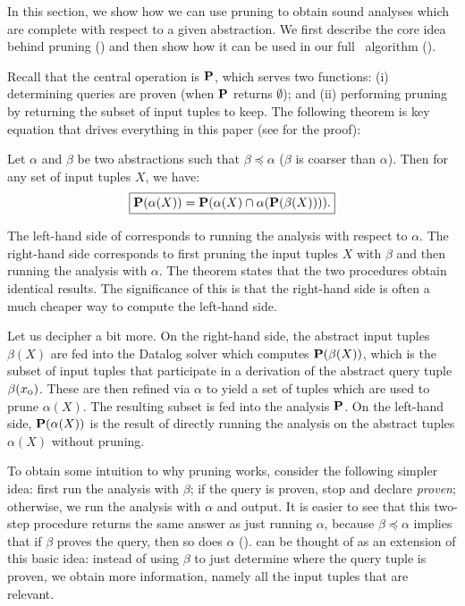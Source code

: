 
In this section, we show how we can use pruning to obtain sound analyses which
are complete with respect to a given abstraction.  We first describe the core
idea behind pruning () and then show how it can be used in our
full \PR\ algorithm ().


Recall that the central operation is $\mathbf{P}$, which serves two functions: (i)
determining queries are proven (when $\mathbf{P}$ returns $\emptyset$); and (ii)
performing pruning by returning the subset of input tuples to keep.
The following theorem is key equation that drives everything in this paper (see  for the proof):

\begin{theorem}
\label{thm:master}
Let $\alpha$ and $\beta$ be two abstractions such that $\beta \preceq \alpha$
($\beta$ is coarser than $\alpha$).
Then for any set of input tuples $X$, we have:
\begin{align}
\label{eqn:master}
\boxed{
\mathbf{P}(\alpha(X)) = \mathbf{P}(\alpha(X) \cap \alpha(\mathbf{P}(\beta(X)))).
}
\end{align}
\end{theorem}

The left-hand side of  corresponds to running the analysis with respect to $\alpha$.
The right-hand side corresponds to first pruning the input tuples $X$
with $\beta$ and then running the analysis with $\alpha$.
The theorem states that the two procedures obtain identical results.
The significance of this is that the right-hand side is often a much cheaper
way to compute the left-hand side.

Let us decipher  a bit more.
On the right-hand side,
the abstract input tuples $\beta(X)$
are fed into the Datalog solver which computes $\mathbf{P}(\beta(X))$,
which is the subset of input tuples that participate in a derivation of the abstract query tuple $\beta(x_\text{\sc o})$.
These are then refined via $\alpha$ to yield a set of tuples which are used to prune $\alpha(X)$.
The resulting subset is fed into the analysis $\mathbf{P}$.
On the left-hand side, $\mathbf{P}(\alpha(X))$ is the result of directly running the analysis
on the abstract tuples $\alpha(X)$ without pruning.

To obtain some intuition to why pruning works,
consider the following simpler idea:
first run the analysis with $\beta$; if the query is proven, stop and declare {\em proven}; otherwise, we run the analysis
with $\alpha$ and output.
It is easier to see that this two-step procedure returns the same answer as just running $\alpha$,
because $\beta \preceq \alpha$ implies that if $\beta$ proves the query, then so does $\alpha$
().
 can be thought of as an extension of this basic idea:
instead of using $\beta$ to just determine where the query tuple is proven,
we obtain more information, namely all the input tuples that are relevant.

